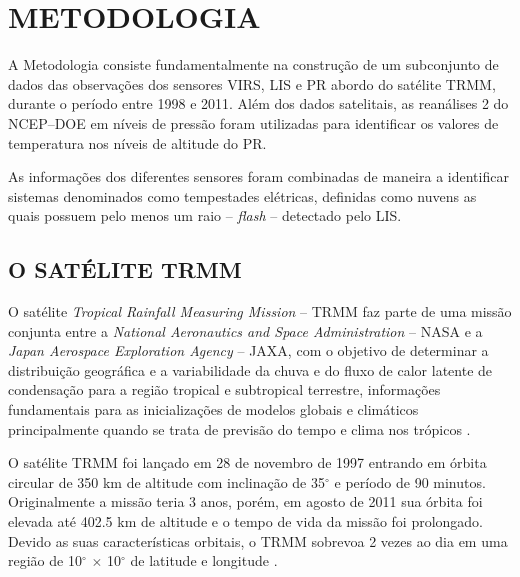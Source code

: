 \chapter{METODOLOGIA}
\label{metodologia}

A Metodologia consiste fundamentalmente na construção de um subconjunto de dados das observações dos sensores VIRS, LIS e PR abordo do satélite TRMM, durante o período entre 1998 e 2011. Além dos dados satelitais, as reanálises 2 do NCEP--DOE  em níveis de pressão foram utilizadas para identificar os valores de temperatura nos níveis de altitude do PR.

As informações dos diferentes sensores foram combinadas de maneira a identificar sistemas denominados como tempestades elétricas, definidas como nuvens as quais possuem pelo menos um raio -- \textit{flash} -- detectado pelo LIS. 


\section{O SATÉLITE TRMM}
\label{metodologiaTRMM}

O satélite \textit{Tropical Rainfall Measuring Mission} -- TRMM  faz parte de uma missão conjunta entre a \textit{National Aeronautics and Space Administration} -- NASA e  a \textit{Japan Aerospace Exploration Agency} -- JAXA,  com o objetivo de determinar a distribuição geográfica e a variabilidade da chuva e do fluxo de calor latente de condensação para a região tropical e subtropical terrestre, informações fundamentais para as inicializações de modelos globais e climáticos principalmente quando se trata de previsão do tempo e clima nos trópicos \cite{kummerok1998,simpson1988}.
  

O satélite TRMM foi lançado em 28 de novembro de 1997 entrando em órbita circular de 350 km de altitude com inclinação de 35$^{\circ}$ e período de 90 minutos. Originalmente a missão teria 3 anos, porém, em agosto de 2011 sua órbita foi elevada até 402.5 km de altitude e o tempo  de vida da missão foi prolongado. Devido as suas características orbitais, o TRMM sobrevoa 2 vezes ao dia em uma região de 10$^{\circ}$ $\times$ 10$^{\circ}$ de latitude e longitude \cite{simpson1988}.  
  
